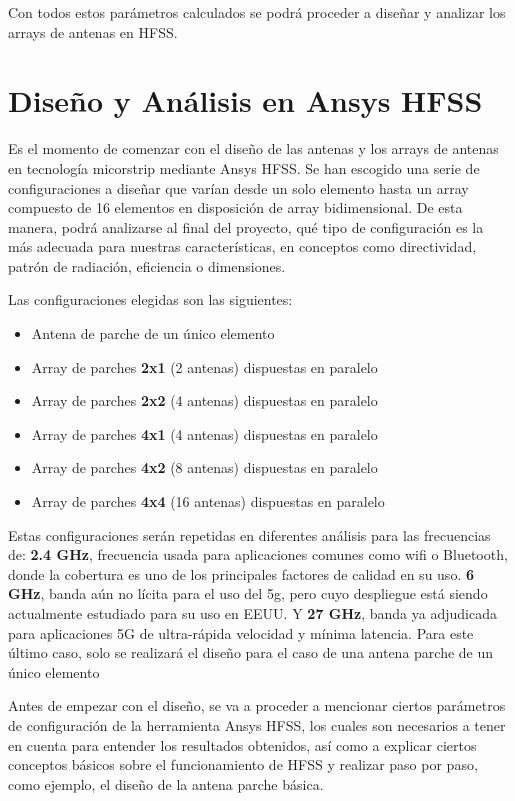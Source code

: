 \par Con todos estos parámetros calculados se podrá proceder a diseñar y analizar los arrays de antenas en HFSS.

\section{Diseño y Análisis en Ansys HFSS}

\par Es el momento de comenzar con el diseño de las antenas y los arrays de antenas en tecnología micorstrip mediante Ansys HFSS. Se han escogido una serie de configuraciones a diseñar que varían desde un solo elemento hasta un array compuesto de 16 elementos en disposición de array bidimensional. De esta manera, podrá analizarse al final del proyecto, qué tipo de configuración es la más adecuada para nuestras características, en conceptos como directividad, patrón de radiación, eficiencia o dimensiones.
\\
\par Las configuraciones elegidas son las siguientes:

\begin{itemize}
\item Antena de parche de un único elemento
\item Array de parches \textbf{2x1} (2 antenas) dispuestas en paralelo
\item Array de parches \textbf{2x2} (4 antenas) dispuestas en paralelo
\item Array de parches \textbf{4x1} (4 antenas) dispuestas en paralelo
\item Array de parches \textbf{4x2} (8 antenas) dispuestas en paralelo
\item Array de parches \textbf{4x4} (16 antenas) dispuestas en paralelo
\end{itemize}

\par Estas configuraciones serán repetidas en diferentes análisis para las frecuencias de: \textbf{2.4 GHz}, frecuencia usada para aplicaciones comunes como \gls{wifi} o Bluetooth, donde la cobertura es uno de los principales factores de calidad en su uso. \textbf{6 GHz}, banda aún no lícita para el uso del \gls{5g}, pero cuyo despliegue está siendo actualmente estudiado para su uso en EEUU. Y \textbf{27 GHz}, banda ya adjudicada para aplicaciones 5G de ultra-rápida velocidad y mínima latencia. Para este último caso, solo se realizará el diseño para el caso de una antena parche de un único elemento 
\\
\par Antes de empezar con el diseño, se va a proceder a mencionar ciertos parámetros de configuración de la herramienta Ansys HFSS, los cuales son necesarios a tener en cuenta para entender los resultados obtenidos, así como a explicar ciertos conceptos básicos sobre el funcionamiento de HFSS y realizar paso por paso, como ejemplo, el diseño de la antena parche básica.

